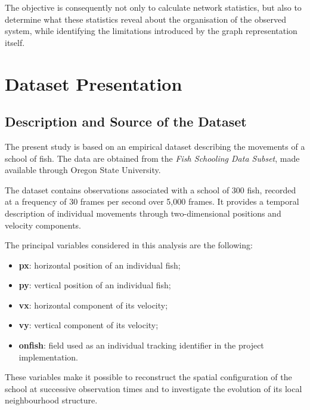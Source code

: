 \documentclass[10pt,a4paper]{article}
\begin{document}
The objective is consequently not only to calculate network
statistics, but also to determine what these statistics
reveal about the organisation of the observed system, while
identifying the limitations introduced by the graph
representation itself.


\section{Dataset Presentation}

\subsection{Description and Source of the Dataset}

The present study is based on an empirical dataset describing
the movements of a school of fish. The data are obtained
from the \textit{Fish Schooling Data Subset}, made available
through Oregon State University.

The dataset contains observations associated with a school
of 300 fish, recorded at a frequency of 30 frames per second
over 5,000 frames. It provides a temporal description of
individual movements through two-dimensional positions and
velocity components.

The principal variables considered in this analysis are
the following:

\begin{itemize}

   \item \textbf{px}: horizontal position of an individual
   fish;

   \item \textbf{py}: vertical position of an individual
   fish;

   \item \textbf{vx}: horizontal component of its velocity;

   \item \textbf{vy}: vertical component of its velocity;

   \item \textbf{onfish}: field used as an individual
   tracking identifier in the project implementation.

\end{itemize}

These variables make it possible to reconstruct the spatial
configuration of the school at successive observation times
and to investigate the evolution of its local neighbourhood
structure.
\end{document}
